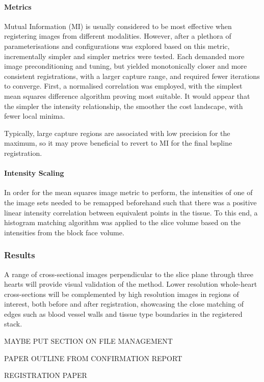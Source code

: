       \paragraph{Metrics}
        Mutual Information (MI) is usually considered to be most effective when registering images from different modalities. However, after a plethora of parameterisations and configurations was explored based on this metric, incrementally simpler and simpler metrics were tested. Each demanded more image preconditioning and tuning, but yielded monotonically closer and more consistent registrations, with a larger capture range, and required fewer iterations to converge. First, a normalised correlation was employed, with the simplest mean squares difference algorithm proving most suitable. It would appear that the simpler the intensity relationship, the smoother the cost landscape, with fewer local minima.

        Typically, large capture regions are associated with low precision for the maximum, so it may prove beneficial to revert to MI for the final bspline registration.

      \paragraph{Intensity Scaling}
        In order for the mean squares image metric to perform, the intensities of one of the image sets needed to be remapped beforehand such that there was a positive linear intensity correlation between equivalent points in the tissue. To this end, a histogram matching algorithm was applied to the slice volume based on the intensities from the block face volume.
        
  \subsubsection{Results}
    A range of cross-sectional images perpendicular to the slice plane through three hearts will provide visual validation of the method. Lower resolution whole-heart cross-sections will be complemented by high resolution images in regions of interest, both before and after registration, showcasing the close matching of edges such as blood vessel walls and tissue type boundaries in the registered stack.
    
    MAYBE PUT SECTION ON FILE MANAGEMENT
    
PAPER OUTLINE FROM CONFIRMATION REPORT

REGISTRATION PAPER

